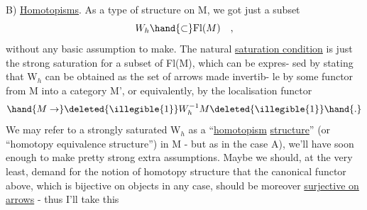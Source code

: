 B)  \uline{Homotopisms}.  As a type of structure on M, we got just a subset
\[ W_h \hand{\subset} \mathrm{Fl}(M) \quad , \]
without any basic assumption to make.  The natural \uline{saturation condition}
is just the strong saturation for a subset of Fl(M),  which can be expres-%
sed by stating that W$_h$ can be obtained as the set of arrows made invertib-%
le by some functor from M into a category M',  or equivalently,  by the
localisation functor
\[ \hand{M\to} \deleted{\illegible{1}} W_h^{-1}M \deleted{\illegible{1}} \hand{.} \]
We may refer to a strongly saturated W$_h$ as a ``\uline{homotopism} \uline{structure}''
(or ``homotopy equivalence structure'') in M  -  but as in the case A),
we'll have soon enough to make pretty strong extra assumptions.  Maybe
we should, at the very least,  demand for the notion of homotopy structure
that the canonical functor above,  which is bijective on objects in any
case,  should be moreover \uline{surjective on arrows}  -  thus I'll take this

